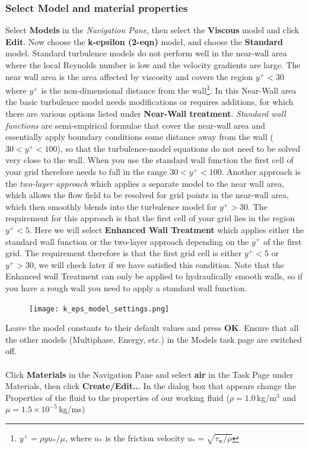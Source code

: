 \documentclass[11pt,a4paper,oneside]{scrartcl}
\newcommand\bfr[1]{\textcolor[rgb]{1,0.00,0.00}{\textbf{\textsf{#1}}}}
\begin{document}
\subsubsection{Select Model and material properties}

Select \bfr{Models} in the \emph{Navigation Pane}, then select the \bfr{Viscous} model and click \bfr{Edit}. Now choose the \bfr{k-epsilon (2-eqn)} model, and choose the \bfr{Standard} model. Standard turbulence models do not perform well in the near-wall area where the local Reynolds number is low and the velocity gradients are large. The near wall area is the area affected by viscosity and covers the region $y^+<30$ where $y^+$ is the non-dimensional distance from the wall\footnote{$y^+=\rho yu_{*}/\mu$, where $u_{*}$ is the friction velocity $u_{*}=\sqrt{\tau_\mathrm{w}/\rho}$}. In this Near-Wall area the basic turbulence model needs modifications or requires additions, for which there are various options listed under \bfr{Near-Wall treatment}. \emph{Standard wall functions} are semi-empirical formulae that cover the near-wall area and  essentially apply boundary conditions some distance away from the wall ($30 < y^+ < 100$), so that the turbulence-model equations do not need to be solved very close to the wall. When you use the standard wall function the first cell of your grid therefore needs to fall in the range $30 < y^+ < 100$. Another approach is the \emph{two-layer approach} which applies a separate model to the near wall area, which allows the flow field to be resolved for grid points in the near-wall area, which then smoothly blends into the turbulence model for $y^+>30$. The requirement for this approach is that the first cell of your grid lies in the region $y^+<5$. Here we will select \bfr{Enhanced Wall Treatment} which applies either the standard wall function or the two-layer approach depending on the $y^+$ of the first grid. The requirement therefore is that the first grid cell is either $y^+<5$ or $y^+>30$, we will check later if we have satisfied this condition. Note that the Enhanced wall Treatment can only be applied to hydraulically smooth walls, so if you have a rough wall you need to apply a standard wall function.

\begin{figure}[H]
\begin{center}
\texttt{[image: k\_eps\_model\_settings.png]}
\end{center}
\end{figure}

Leave the model constants to their default values and press \bfr{OK}.
Ensure that all the other models (Multiphase, Energy, etc.) in the Models task page are switched off.
\\
\\
Click \bfr{Materials} in the Navigation Pane and select \bfr{air} in the Task Page under Materials, then click \bfr{Create/Edit..}.  In the dialog box that appears change the Properties of the fluid to the properties of our working fluid ($\rho=1.0$\,kg/m$^3$ and $\mu=1.5\times10^{-5}$\,kg/ms)
\end{document}
